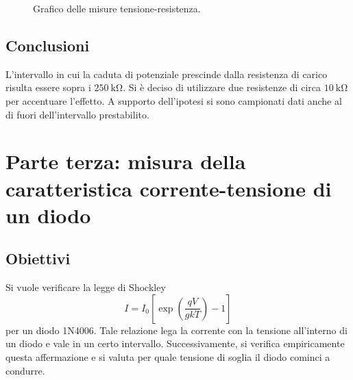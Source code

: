 \documentclass[a4paper]{article}
\begin{document}
\begin{figure}[H]
	\centering
    	\hspace*{-0.75cm}
	\caption[Partitore resistivo]{Grafico delle misure tensione-resistenza.}
	\label{fig:part_resist}
\end{figure}

\subsection{Conclusioni}
L'intervallo in cui la caduta di potenziale prescinde dalla resistenza di carico risulta essere sopra i $\SI{250}{\kilo\ohm}$. Si è deciso di utilizzare due resistenze di circa $\SI{10}{\kilo\ohm}$ per accentuare l'effetto. A supporto dell'ipotesi si sono campionati dati anche al di fuori dell'intervallo prestabilito.
\clearpage

\section{Parte terza: misura della caratteristica corrente-tensione di un diodo}
\subsection{Obiettivi}
Si vuole verificare la legge di Shockley
\[
I = I_0\left[ \exp\left( \frac{qV}{gkT} \right)-1 \right] 
\] 
per un diodo 1N4006. Tale relazione lega la corrente con la tensione all'interno di un diodo e vale in un certo intervallo. Successivamente, si verifica empiricamente questa affermazione e si valuta per quale tensione di soglia il diodo cominci a condurre.
\end{document}
